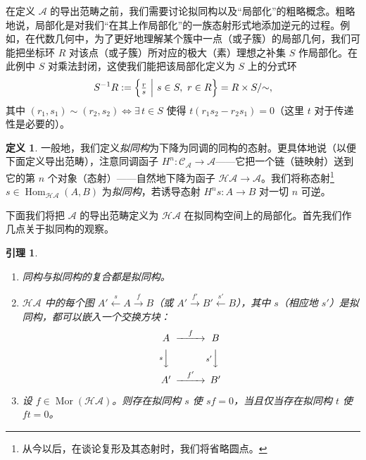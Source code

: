 \documentclass[11pt,a4paper]{article}
\theoremstyle{plain}
\newtheorem{lemma}[theorem]{引理}
\theoremstyle{definition}
\newtheorem{definition}[theorem]{定义}
\begin{document}
在定义 $\mathcal{A}$ 的导出范畴之前，我们需要讨论拟同构以及“局部化”的粗略概念。粗略地说，局部化是对我们“在其上作局部化”的一族态射形式地添加逆元的过程。例如，在代数几何中，为了更好地理解某个簇中一点（或子簇）的局部几何，我们可能把坐标环 $R$ 对该点（或子簇）所对应的极大（素）理想之补集 $S$ 作局部化。在此例中 $S$ 对乘法封闭，这使我们能把该局部化定义为 $S$ 上的分式环
\[
S^{-1}R:=\Bigl\{\tfrac{r}{s}\ \Big|\ s\in S,\ r\in R\Bigr\}=R\times S/{\sim},
\]
其中 $(r_1,s_1)\sim(r_2,s_2)\iff\exists\,t\in S$ 使得 $t(r_1s_2-r_2s_1)=0$（这里 $t$ 对于传递性是必要的）。

\begin{definition}
一般地，我们定义\emph{拟同构}为下降为同调的同构的态射。更具体地说（以便下面定义导出范畴），注意同调函子 $H^n:\mathcal{C}_{\mathcal{A}}\to\mathcal{A}$——它把一个链（链映射）送到它的第 $n$ 个对象（态射）——自然地下降为函子 $\mathcal{H}\mathcal{A}\to\mathcal{A}$。我们将称态射\footnote{从今以后，在谈论复形及其态射时，我们将省略圆点。} $s\in\operatorname{Hom}_{\mathcal{H}\mathcal{A}}(A,B)$ 为\emph{拟同构}，若诱导态射 $H^ns:A\to B$ 对一切 $n$ 可逆。
\end{definition}

下面我们将把 $\mathcal{A}$ 的导出范畴定义为 $\mathcal{H}\mathcal{A}$ 在拟同构空间上的局部化。首先我们作几点关于拟同构的观察。

\begin{lemma}
\begin{enumerate}[label=\alph*)]
  \item 同构与拟同构的复合都是拟同构。
  \item $\mathcal{H}\mathcal{A}$ 中的每个图 $A'\xleftarrow{s}A\xrightarrow{f}B$（或 $A'\xrightarrow{f'}B'\xleftarrow{s'}B$），其中 $s$（相应地 $s'$）是拟同构，都可以嵌入一个交换方块：
  \[
  \begin{CD}
  A @>{f}>> B\\
  @V{s}VV @V{s'}VV\\
  A' @>{f'}>> B'
  \end{CD}
  \]
  \item 设 $f\in\operatorname{Mor}(\mathcal{H}\mathcal{A})$。则存在拟同构 $s$ 使 $sf=0$，当且仅当存在拟同构 $t$ 使 $ft=0$。
\end{enumerate}
\end{lemma}
\end{document}
